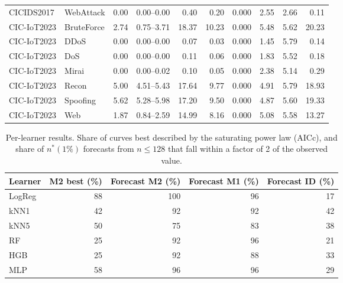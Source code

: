 \begin{table}[ht]
{\begin{tabular}{llrrrrrrrr}
CICIDS2017 & WebAttack & 0.00 & 0.00--0.00 & 0.40 & 0.20 & 0.000 & 2.55 & 2.66 & 0.11 \\
CIC-IoT2023 & BruteForce & 2.74 & 0.75--3.71 & 18.37 & 10.23 & 0.000 & 5.48 & 5.62 & 20.23 \\
CIC-IoT2023 & DDoS & 0.00 & 0.00--0.00 & 0.07 & 0.03 & 0.000 & 1.45 & 5.79 & 0.14 \\
CIC-IoT2023 & DoS & 0.00 & 0.00--0.00 & 0.11 & 0.06 & 0.000 & 1.83 & 5.52 & 0.18 \\
CIC-IoT2023 & Mirai & 0.00 & 0.00--0.02 & 0.10 & 0.05 & 0.000 & 2.38 & 5.14 & 0.29 \\
CIC-IoT2023 & Recon & 5.00 & 4.51--5.43 & 17.64 & 9.77 & 0.000 & 4.91 & 5.79 & 18.93 \\
CIC-IoT2023 & Spoofing & 5.62 & 5.28--5.98 & 17.20 & 9.50 & 0.000 & 4.87 & 5.60 & 19.33 \\
CIC-IoT2023 & Web & 1.87 & 0.84--2.59 & 14.99 & 8.16 & 0.000 & 5.08 & 5.58 & 13.27 \\
\bottomrule
\end{tabular}}
\end{table}

\begin{table}[ht]\centering\small
\caption{Per-learner results. Share of curves best described by the saturating power law (AICc), and share of $n^*(1\%)$ forecasts from $n\le128$ that fall within a factor of 2 of the observed value.}
\label{tab:s_learners}
\begin{tabular}{lrrrr}
\toprule
Learner & M2 best (\%) & Forecast M2 (\%) & Forecast M1 (\%) & Forecast ID (\%) \\
\midrule
LogReg & 88 & 100 & 96 & 17 \\
kNN1 & 42 & 92 & 92 & 42 \\
kNN5 & 50 & 75 & 83 & 38 \\
RF & 25 & 92 & 96 & 21 \\
HGB & 25 & 92 & 88 & 33 \\
MLP & 58 & 96 & 96 & 29 \\
\bottomrule
\end{tabular}
\end{table}
